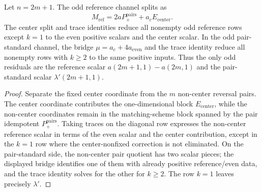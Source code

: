 \begin{lemma}\label{lem:oddreduction}
Let $n=2m+1$.  The odd reference channel splits as
\[
  M_{\mathrm{ref}}=2aP_+^{\mathrm{pairs}}+a_cE_{\mathrm{center}}.
\]
The center split and trace identities reduce all nonempty odd reference rows except $k=1$ to the even positive
scalars and the center scalar.  In the odd pair-standard channel, the bridge $\mu=a_c+4a_{\mathrm{even}}$ and the
trace identity reduce all nonempty rows with $k\ge2$ to the same positive inputs.  Thus the only odd residuals are the
reference scalar $a(2m+1,1)-a(2m,1)$ and the pair-standard scalar $\lambda'(2m+1,1)$.
\end{lemma}

\begin{proof}
Separate the fixed center coordinate from the $m$ non-center reversal pairs.  The center coordinate contributes the
one-dimensional block $E_{\mathrm{center}}$, while the non-center coordinates remain in the matching-scheme block
spanned by the pair idempotent $P_+^{\mathrm{pairs}}$.  Taking traces on the diagonal row expresses the non-center
reference scalar in terms of the even scalar and the center contribution, except in the $k=1$ row where the
center-nonfixed correction is not eliminated.  On the pair-standard side, the non-center pair quotient has two scalar
pieces; the displayed bridge identifies one of them with already positive reference/even data, and the trace identity
solves for the other for $k\ge2$.  The row $k=1$ leaves precisely $\lambda'$.
\end{proof}
